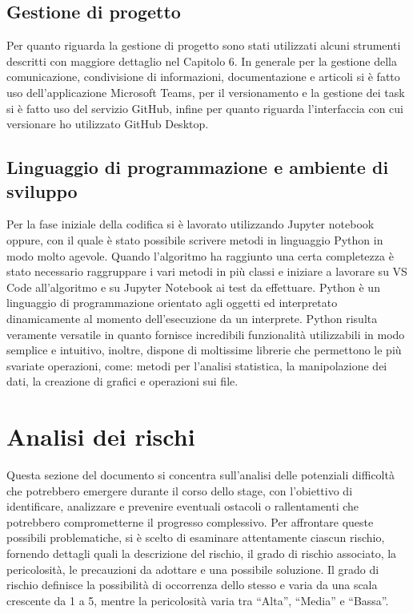 \subsection{Gestione di progetto}
Per quanto riguarda la gestione di progetto sono stati utilizzati alcuni strumenti descritti con maggiore dettaglio nel Capitolo 6. In generale per la gestione della comunicazione, condivisione di informazioni, documentazione e articoli si è fatto uso dell’applicazione Microsoft Teams, per il versionamento e la gestione dei task si è fatto uso del servizio GitHub, infine per quanto riguarda l’interfaccia con cui versionare ho utilizzato GitHub Desktop.

\subsection{Linguaggio di programmazione e ambiente di sviluppo}
Per la fase iniziale della codifica si è lavorato utilizzando Jupyter notebook oppure, con il quale è stato possibile scrivere metodi in linguaggio Python in modo molto agevole. Quando l'algoritmo ha raggiunto una certa completezza è stato necessario raggruppare i vari metodi in più classi e iniziare a lavorare su VS Code all'algoritmo e su Jupyter Notebook ai test da effettuare.
Python è un linguaggio di programmazione orientato agli oggetti ed interpretato dinamicamente al momento dell’esecuzione da un interprete. Python risulta veramente versatile in quanto fornisce incredibili funzionalità utilizzabili in modo semplice e intuitivo, inoltre, dispone di moltissime librerie che permettono le più svariate operazioni, come: metodi per l'analisi statistica, la manipolazione dei dati, la creazione di grafici e operazioni sui file.

\section{Analisi dei rischi}

Questa sezione del documento si concentra sull’analisi delle potenziali difficoltà che potrebbero emergere durante il corso dello stage, con l’obiettivo di identificare, analizzare e prevenire eventuali ostacoli o rallentamenti che potrebbero comprometterne il progresso complessivo. Per affrontare queste possibili problematiche, si è scelto di esaminare attentamente ciascun rischio, fornendo dettagli quali la descrizione del rischio, il grado di rischio associato, la pericolosità, le precauzioni da adottare e una possibile soluzione. Il grado di rischio definisce la possibilità di occorrenza dello stesso e varia da una scala crescente da 1 a 5, mentre la pericolosità varia tra “Alta”, “Media” e “Bassa”. 

